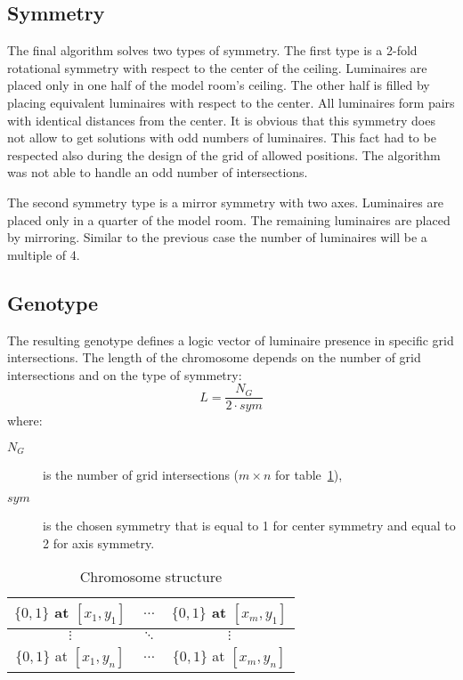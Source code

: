 \subsection{Symmetry}
The final algorithm solves two types of symmetry. The first type is a 2-fold rotational symmetry with respect to the center of the ceiling. Luminaires are placed only in one half of the model room's ceiling. The other half is filled by placing equivalent luminaires with respect to the center. All luminaires form pairs with identical distances from the center. It is obvious that this symmetry does not allow to get solutions with odd numbers of luminaires. This fact had to be respected also during the design of the grid of allowed positions. The algorithm was not able to handle an odd number of intersections.

The second symmetry type is a mirror symmetry with two axes. Luminaires are placed only in a quarter of the model room. The remaining luminaires are placed by mirroring. Similar to the previous case the number of luminaires will be a multiple of 4.

\subsection{Genotype}
The resulting genotype defines a logic vector of luminaire presence in specific grid intersections. The length of the chromosome depends on the number of grid intersections and on the type of symmetry:
\begin{equation}
\label{eq:chromLength}
L = \frac{N_G}{2\cdot sym}
\end{equation}
where:
\begin{description}
	\item[$N_G$] is the number of grid intersections ($m\times n$ for table~\ref{tab:strucgenotype}),
	\item[$sym$] is the chosen symmetry that is equal to 1 for center symmetry and equal to 2 for axis symmetry.
\end{description}

\begin{table}[htb]
	\renewcommand{\arraystretch}{1.3}
	\caption{Chromosome structure}
 	\label{tab:strucgenotype}
	\centering
  \begin{tabular}{| c | c | c |}
    \hline
    $\lbrace0,1\rbrace$ at $[x_1,y_1]$ & $\ldots$ & $\lbrace0,1\rbrace$ at $[x_m,y_1]$ \\
    \hline
    $\vdots$ & $\ddots$ & $\vdots$ \\
    \hline
    $\lbrace0,1\rbrace$ at $[x_1,y_n]$ & $\ldots$ & $\lbrace0,1\rbrace$ at $[x_m,y_n]$ \\
    \hline
  \end{tabular}
\end{table}

